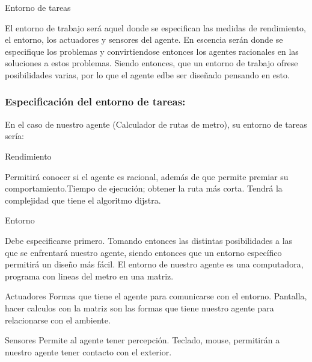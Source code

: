 \documentclass{article}
\begin{document}
\vspace{5mm}

Entorno de tareas

\vspace{5mm}
El entorno de trabajo será aquel donde se especifican las medidas de rendimiento, el entorno, los actuadores y sensores del agente. En escencia serán donde se especifique los problemas y convirtiendose entonces los agentes racionales  en las soluciones a estos problemas. Siendo entonces, que un entorno de trabajo ofrese posibilidades varias, por lo que el agente edbe ser diseñado pensando en esto. 


\subsubsection{Especificación del entorno de tareas:}
En el caso de nuestro agente (Calculador de rutas de metro), su entorno de tareas sería:

\vspace{5mm}

Rendimiento
\vspace{5mm}

Permitirá conocer si el agente es racional, además de que permite premiar su comportamiento.Tiempo de ejecución; obtener la ruta más corta. Tendrá la complejidad que tiene el algoritmo dijstra.

\vspace{5mm}
Entorno
\vspace{5mm}

Debe especificarse primero. Tomando entonces las distintas posibilidades a las que se enfrentará nuestro agente, siendo entonces que un entorno específico permitirá un diseño más fácil.
El entorno de nuestro agente es una computadora, programa con lineas del metro en una matriz.

\vspace{5mm}

Actuadores
\vspace{5mm}
Formas que tiene el agente para comunicarse con el entorno.
Pantalla, hacer calculos con la matriz son las formas que tiene nuestro agente para relacionarse con el ambiente.

\vspace{5mm}

Sensores
\vspace{5mm}
Permite al agente tener percepción.
Teclado, mouse, permitirán a nuestro agente tener contacto con el exterior.
\end{document}
